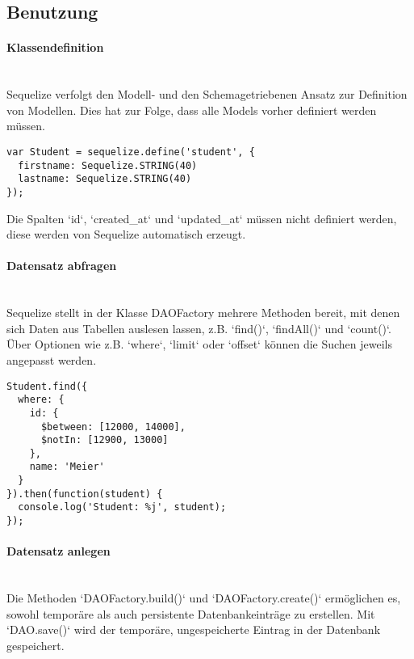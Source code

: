 \subsection{Benutzung}

\paragraph{Klassendefinition} \hspace{0pt} \\
Sequelize verfolgt den Modell- und den Schemagetriebenen Ansatz zur Definition von Modellen. Dies hat zur Folge, dass alle Models vorher definiert werden müssen.

\begin{lstlisting}[caption=Klassendefinition (Sequelize)]
var Student = sequelize.define('student', {
  firstname: Sequelize.STRING(40)
  lastname: Sequelize.STRING(40)
});	
\end{lstlisting}

\noindent Die Spalten `id`, `created\_at` und `updated\_at` müssen nicht definiert werden, diese werden von Sequelize automatisch erzeugt.


\paragraph{Datensatz abfragen} \hspace{0pt} \\
Sequelize stellt in der Klasse DAOFactory mehrere Methoden bereit, mit denen sich Daten aus Tabellen auslesen lassen, z.B. `find()`, `findAll()` und `count()`. Über Optionen wie z.B. `where`, `limit` oder `offset` können die Suchen jeweils angepasst werden.

\begin{lstlisting}[caption=Datensatz abfragen (Sequelize)]
Student.find({
  where: {
    id: {
      $between: [12000, 14000],
      $notIn: [12900, 13000]
    },
    name: 'Meier'
  }
}).then(function(student) {
  console.log('Student: %j', student);
});	
\end{lstlisting}


\paragraph{Datensatz anlegen} \hspace{0pt} \\
Die Methoden `DAOFactory.build()` und `DAOFactory.create()` ermöglichen es, sowohl temporäre als auch persistente Datenbankeinträge zu erstellen. Mit `DAO.save()` wird der temporäre, ungespeicherte Eintrag in der Datenbank gespeichert.

